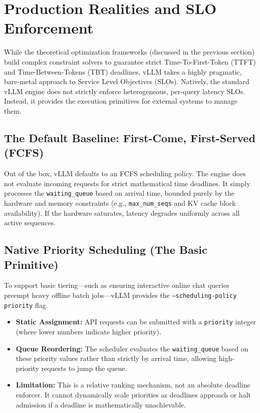 \documentclass[11pt]{article}
\begin{document}
\section{Production Realities and SLO Enforcement}
\label{sec:production_slo_enforcement}

While the theoretical optimization frameworks (discussed in the previous section) build complex constraint solvers to guarantee strict Time-To-First-Token (TTFT) and Time-Between-Tokens (TBT) deadlines, vLLM takes a highly pragmatic, bare-metal approach to Service Level Objectives (SLOs). Natively, the standard vLLM engine does not strictly enforce heterogeneous, per-query latency SLOs. Instead, it provides the execution primitives for external systems to manage them.

\subsection{The Default Baseline: First-Come, First-Served (FCFS)}
\label{subsec:fcfs_baseline}

Out of the box, vLLM defaults to an FCFS scheduling policy. The engine does not evaluate incoming requests for strict mathematical time deadlines. It simply processes the \texttt{waiting\_queue} based on arrival time, bounded purely by the hardware and memory constraints (e.g., \texttt{max\_num\_seqs} and KV cache block availability). If the hardware saturates, latency degrades uniformly across all active sequences.

\subsection{Native Priority Scheduling (The Basic Primitive)}
\label{subsec:native_priority_scheduling}

To support basic tiering—such as ensuring interactive online chat queries preempt heavy offline batch jobs—vLLM provides the \texttt{--scheduling-policy priority} flag. 
\begin{itemize}
    \item \textbf{Static Assignment:} API requests can be submitted with a \texttt{priority} integer (where lower numbers indicate higher priority).
    \item \textbf{Queue Reordering:} The scheduler evaluates the \texttt{waiting\_queue} based on these priority values rather than strictly by arrival time, allowing high-priority requests to jump the queue.
    \item \textbf{Limitation:} This is a relative ranking mechanism, not an absolute deadline enforcer. It cannot dynamically scale priorities as deadlines approach or halt admission if a deadline is mathematically unachievable.
\end{itemize}
\end{document}
